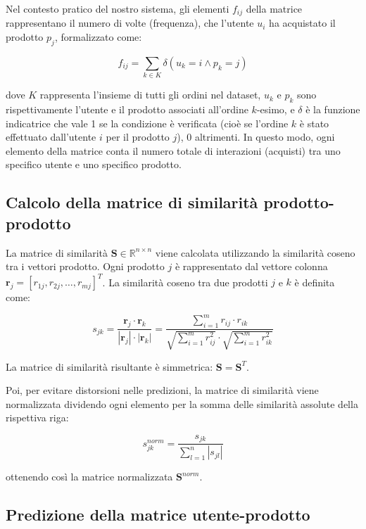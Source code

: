 Nel contesto pratico del nostro sistema, gli elementi $f_{ij}$ della matrice rappresentano il numero di volte (frequenza), che l'utente $u_i$ ha acquistato il prodotto $p_j$, formalizzato come:

\begin{equation}
f_{ij} = \sum_{k \in K} \delta(u_k = i \land p_k = j)
\end{equation}

dove $K$ rappresenta l'insieme di tutti gli ordini nel dataset, $u_k$ e $p_k$ sono rispettivamente l'utente e il prodotto associati all'ordine $k$-esimo, e $\delta$ è la funzione indicatrice che vale 1 se la condizione è verificata (cioè se l'ordine $k$ è stato effettuato dall'utente $i$ per il prodotto $j$), 0 altrimenti. In questo modo, ogni elemento della matrice conta il numero totale di interazioni (acquisti) tra uno specifico utente e uno specifico prodotto.

\subsection{Calcolo della matrice di similarità prodotto-prodotto}

La matrice di similarità $\mathbf{S} \in \mathbb{R}^{n \times n}$ viene calcolata utilizzando la similarità coseno tra i vettori prodotto. Ogni prodotto $j$ è rappresentato dal vettore colonna $\mathbf{r}_j = [r_{1j}, r_{2j}, \ldots, r_{mj}]^T$. La similarità coseno tra due prodotti $j$ e $k$ è definita come:

\begin{equation}
s_{jk} = \frac{\mathbf{r}_j \cdot \mathbf{r}_k}{|\mathbf{r}_j| \cdot |\mathbf{r}_k|} = \frac{\sum_{i=1}^{m} r_{ij} \cdot r_{ik}}{\sqrt{\sum_{i=1}^{m} r_{ij}^2} \cdot \sqrt{\sum_{i=1}^{m} r_{ik}^2}}
\end{equation}

La matrice di similarità risultante è simmetrica: $\mathbf{S} = \mathbf{S}^T$.

Poi, per evitare distorsioni nelle predizioni, la matrice di similarità viene normalizzata dividendo ogni elemento per la somma delle similarità assolute della rispettiva riga:

\begin{equation}
s_{jk}^{norm} = \frac{s_{jk}}{\sum_{l=1}^{n} |s_{jl}|}
\end{equation}

ottenendo così la matrice normalizzata $\mathbf{S}^{norm}$.

\subsection{Predizione della matrice utente-prodotto}

